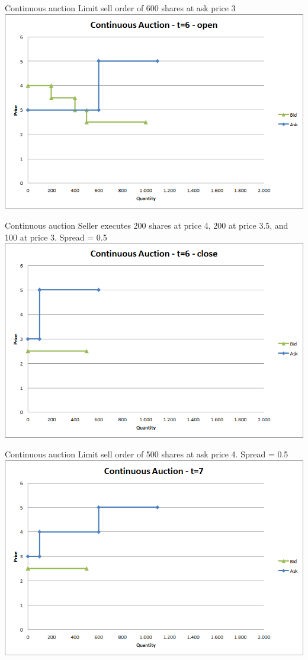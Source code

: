 \documentclass[english,10pt]{beamer}
\theoremstyle{definition}
\begin{document}
\begin{frame}{Continuous auction}
	Limit sell order of 600 shares at ask price 3
	\quad
	\center
	\includegraphics[width=.75\linewidth]{pics/Continuous_t6open}
\end{frame}


\begin{frame}{Continuous auction}
	Seller executes 200 shares at price 4, 200 at price 3.5, and 100 at price 3. Spread = 0.5
	\center
	\includegraphics[width=.75\linewidth]{pics/Continuous_t6close}
\end{frame}


\begin{frame}{Continuous auction}
	Limit sell order of 500 shares at ask price 4. Spread = 0.5
	\center
	\includegraphics[width=.75\linewidth]{pics/Continuous_t7}
\end{frame}
\end{document}
